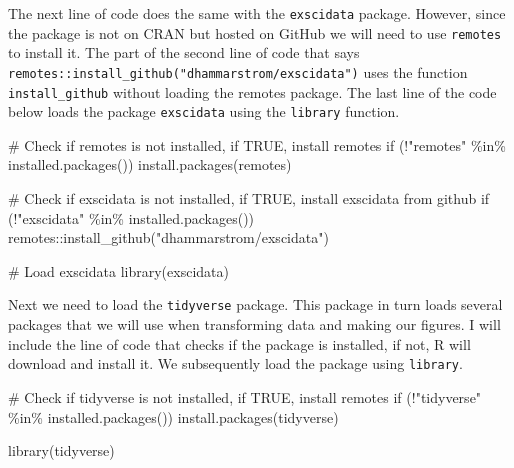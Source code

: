 \documentclass[
  11pt,
  letterpaper,
]{scrbook}
\newenvironment{Shaded}{\begin{snugshade}}{\end{snugshade}}
\newcommand{\CommentTok}[1]{\textcolor[rgb]{0.37,0.37,0.37}{#1}}
\newcommand{\ControlFlowTok}[1]{\textcolor[rgb]{0.00,0.23,0.31}{#1}}
\newcommand{\FunctionTok}[1]{\textcolor[rgb]{0.28,0.35,0.67}{#1}}
\newcommand{\NormalTok}[1]{\textcolor[rgb]{0.00,0.23,0.31}{#1}}
\newcommand{\SpecialCharTok}[1]{\textcolor[rgb]{0.37,0.37,0.37}{#1}}
\newcommand{\StringTok}[1]{\textcolor[rgb]{0.13,0.47,0.30}{#1}}
\begin{document}
The next line of code does the same with the \texttt{exscidata} package.
However, since the package is not on CRAN but hosted on GitHub we will
need to use \texttt{remotes} to install it. The part of the second line
of code that says
\texttt{remotes::install\_github("dhammarstrom/exscidata")} uses the
function \texttt{install\_github} without loading the remotes package.
The last line of the code below loads the package \texttt{exscidata}
using the \texttt{library} function.

\begin{Shaded}
\begin{Highlighting}[numbers=left,,]
\CommentTok{\# Check if remotes is not installed, if TRUE, install remotes}
\ControlFlowTok{if}\NormalTok{ (}\SpecialCharTok{!}\StringTok{"remotes"} \SpecialCharTok{\%in\%} \FunctionTok{installed.packages}\NormalTok{()) }\FunctionTok{install.packages}\NormalTok{(remotes)}

\CommentTok{\# Check if exscidata is not installed, if TRUE, install exscidata from github}
\ControlFlowTok{if}\NormalTok{ (}\SpecialCharTok{!}\StringTok{"exscidata"} \SpecialCharTok{\%in\%} \FunctionTok{installed.packages}\NormalTok{()) remotes}\SpecialCharTok{::}\FunctionTok{install\_github}\NormalTok{(}\StringTok{"dhammarstrom/exscidata"}\NormalTok{)}

\CommentTok{\# Load exscidata}
\FunctionTok{library}\NormalTok{(exscidata)}
\end{Highlighting}
\end{Shaded}

Next we need to load the \texttt{tidyverse} package. This package in
turn loads several packages that we will use when transforming data and
making our figures. I will include the line of code that checks if the
package is installed, if not, R will download and install it. We
subsequently load the package using \texttt{library}.

\begin{Shaded}
\begin{Highlighting}[numbers=left,,]
\CommentTok{\# Check if tidyverse is not installed, if TRUE, install remotes}
\ControlFlowTok{if}\NormalTok{ (}\SpecialCharTok{!}\StringTok{"tidyverse"} \SpecialCharTok{\%in\%} \FunctionTok{installed.packages}\NormalTok{()) }\FunctionTok{install.packages}\NormalTok{(tidyverse)}

\FunctionTok{library}\NormalTok{(tidyverse)}
\end{Highlighting}
\end{Shaded}
\end{document}
